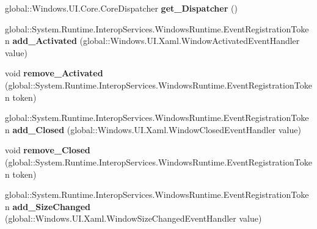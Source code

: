 \begin{DoxyCompactItemize}
\item 
\mbox{\label{class_windows_1_1_u_i_1_1_xaml_1_1_window_a209f50e7cf5593a7150291903f99e541}} 
global\+::\+Windows.\+U\+I.\+Core.\+Core\+Dispatcher {\bfseries get\+\_\+\+Dispatcher} ()
\item 
\mbox{\label{class_windows_1_1_u_i_1_1_xaml_1_1_window_a9c86b88ed3cf1a52a88a638b75e01fa7}} 
global\+::\+System.\+Runtime.\+Interop\+Services.\+Windows\+Runtime.\+Event\+Registration\+Token {\bfseries add\+\_\+\+Activated} (global\+::\+Windows.\+U\+I.\+Xaml.\+Window\+Activated\+Event\+Handler value)
\item 
\mbox{\label{class_windows_1_1_u_i_1_1_xaml_1_1_window_a3d1b79b4484e987c7e8e39d71b41c7f6}} 
void {\bfseries remove\+\_\+\+Activated} (global\+::\+System.\+Runtime.\+Interop\+Services.\+Windows\+Runtime.\+Event\+Registration\+Token token)
\item 
\mbox{\label{class_windows_1_1_u_i_1_1_xaml_1_1_window_adb7cdb439992e4bd48b89f73f5654c16}} 
global\+::\+System.\+Runtime.\+Interop\+Services.\+Windows\+Runtime.\+Event\+Registration\+Token {\bfseries add\+\_\+\+Closed} (global\+::\+Windows.\+U\+I.\+Xaml.\+Window\+Closed\+Event\+Handler value)
\item 
\mbox{\label{class_windows_1_1_u_i_1_1_xaml_1_1_window_af4dfd22097abcbe56cc5002bf87ef515}} 
void {\bfseries remove\+\_\+\+Closed} (global\+::\+System.\+Runtime.\+Interop\+Services.\+Windows\+Runtime.\+Event\+Registration\+Token token)
\item 
\mbox{\label{class_windows_1_1_u_i_1_1_xaml_1_1_window_a883a42ba036296bce22db4dd54a0e00b}} 
global\+::\+System.\+Runtime.\+Interop\+Services.\+Windows\+Runtime.\+Event\+Registration\+Token {\bfseries add\+\_\+\+Size\+Changed} (global\+::\+Windows.\+U\+I.\+Xaml.\+Window\+Size\+Changed\+Event\+Handler value)
\item 
\mbox{\label{class_windows_1_1_u_i_1_1_xaml_1_1_window_a5241aefc4f3d8ef6c34cb6aeaef63884}} 

\end{DoxyCompactItemize}
